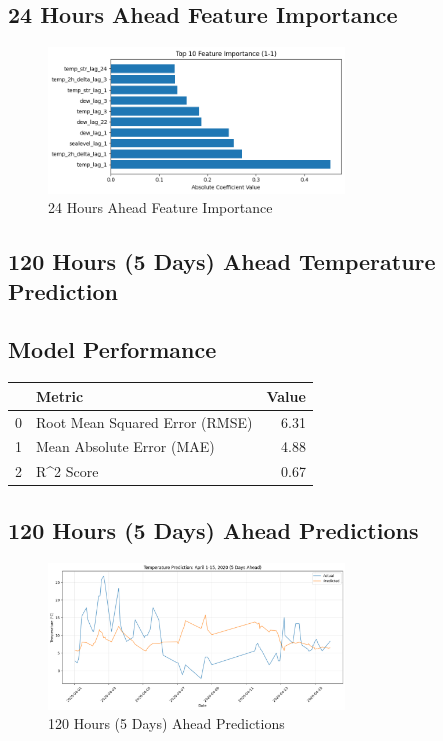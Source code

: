 \subsection{24 Hours Ahead Feature Importance}
\begin{figure}[htbp]
\centering
\includegraphics[width=0.7\textwidth]{1-1-linear_temp_shift_feature_importance.png}
\caption{24 Hours Ahead Feature Importance}
\label{fig:24_hours_ahead_featimp}
\end{figure}



\subsection{120 Hours (5 Days) Ahead Temperature Prediction}
\subsection{Model Performance}
\begin{tabular}{llr}
\toprule
 & Metric & Value \\
\midrule
0 & Root Mean Squared Error (RMSE) & 6.31 \\
1 & Mean Absolute Error (MAE) & 4.88 \\
2 & R^2 Score & 0.67 \\
\bottomrule
\end{tabular}

\subsection{120 Hours (5 Days) Ahead Predictions}
\begin{figure}[htbp]
\centering
\includegraphics[width=0.7\textwidth]{1-2-linear_temp_shift_results.png}
\caption{120 Hours (5 Days) Ahead Predictions}
\label{fig:120_hours_(5_days)_ahead_pred}
\end{figure}

